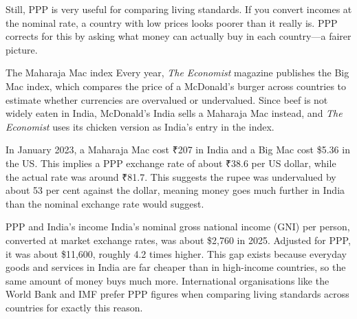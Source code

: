 Still, PPP is very useful for comparing living standards. If you convert incomes at the nominal rate, a country with low prices looks poorer than it really is. PPP corrects for this by asking what money can actually buy in each country---a fairer picture.

\begin{didyouknow}{The Maharaja Mac index}
Every year, \textit{The Economist} magazine publishes the Big Mac index, which compares the price of a McDonald's burger across countries to estimate whether currencies are overvalued or undervalued. Since beef is not widely eaten in India, McDonald's India sells a Maharaja Mac instead, and \textit{The Economist} uses its chicken version as India's entry in the index.

In January 2023, a Maharaja Mac cost ₹207 in India and a Big Mac cost \$5.36 in the US. This implies a PPP exchange rate of about ₹38.6 per US dollar, while the actual rate was around ₹81.7. This suggests the rupee was undervalued by about 53 per cent against the dollar, meaning money goes much further in India than the nominal exchange rate would suggest.\cite{economist2026}
\end{didyouknow}

\begin{didyouknow}{PPP and India's income}
India's nominal gross national income (GNI) per person, converted at market exchange rates, was about \$2,760 in 2025. Adjusted for PPP, it was about \$11,600, roughly 4.2 times higher.\cite{wb2026c} This gap exists because everyday goods and services in India are far cheaper than in high-income countries, so the same amount of money buys much more. International organisations like the World Bank and IMF prefer PPP figures when comparing living standards across countries for exactly this reason.
\end{didyouknow}
